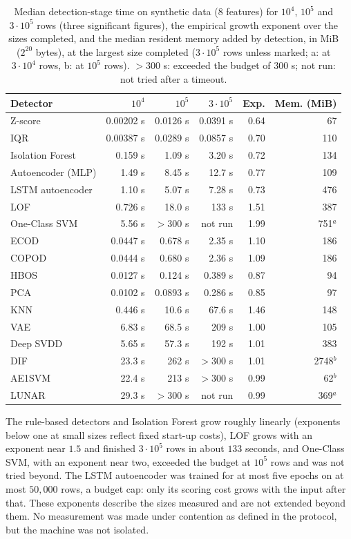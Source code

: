 \documentclass[conference]{IEEEtran}
\begin{document}
\begin{table}[t]
\caption{Median detection-stage time on synthetic data ($8$ features) for
$10^4$, $10^5$ and $3\cdot10^5$ rows (three significant figures), the empirical growth exponent over the
sizes completed, and the median resident memory added by detection, in MiB ($2^{20}$ bytes), at the largest
size completed ($3\cdot10^5$ rows unless marked; a: at $3\cdot10^4$ rows, b: at $10^5$ rows).
$>300$ s: exceeded the budget of $300$ s; not run: not tried after a timeout.}
\label{tab:cost}
\centering
\footnotesize
\setlength{\tabcolsep}{3pt}
\begin{tabular}{lrrrrr}
\toprule
Detector & $10^4$ & $10^5$ & $3\cdot10^5$ & Exp. & Mem. (MiB) \\
\midrule
Z-score & 0.00202 s & 0.0126 s & 0.0391 s & 0.64 & 67 \\
IQR & 0.00387 s & 0.0289 s & 0.0857 s & 0.70 & 110 \\
Isolation Forest & 0.159 s & 1.09 s & 3.20 s & 0.72 & 134 \\
Autoencoder (MLP) & 1.49 s & 8.45 s & 12.7 s & 0.77 & 109 \\
LSTM autoencoder & 1.10 s & 5.07 s & 7.28 s & 0.73 & 476 \\
LOF & 0.726 s & 18.0 s & 133 s & 1.51 & 387 \\
One-Class SVM & 5.56 s & $>300$ s & not run & 1.99 & 751$^{a}$ \\
\midrule
ECOD & 0.0447 s & 0.678 s & 2.35 s & 1.10 & 186 \\
COPOD & 0.0444 s & 0.680 s & 2.36 s & 1.09 & 186 \\
HBOS & 0.0127 s & 0.124 s & 0.389 s & 0.87 & 94 \\
PCA & 0.0102 s & 0.0893 s & 0.286 s & 0.85 & 97 \\
KNN & 0.446 s & 10.6 s & 67.6 s & 1.46 & 148 \\
VAE & 6.83 s & 68.5 s & 209 s & 1.00 & 105 \\
Deep SVDD & 5.65 s & 57.3 s & 192 s & 1.01 & 383 \\
DIF & 23.3 s & 262 s & $>300$ s & 1.01 & 2748$^{b}$ \\
AE1SVM & 22.4 s & 213 s & $>300$ s & 0.99 & 62$^{b}$ \\
LUNAR & 29.3 s & $>300$ s & not run & 0.99 & 369$^{a}$ \\
\bottomrule
\end{tabular}
\end{table}

The rule-based detectors and Isolation Forest grow roughly linearly (exponents
below one at small sizes reflect fixed start-up costs), LOF grows with an
exponent near $1.5$ and finished $3\cdot10^5$ rows in about $133$ seconds, and
One-Class SVM, with an exponent near two, exceeded the budget at $10^5$ rows
and was not tried beyond. The LSTM autoencoder was trained for at most five
epochs on at most $50{,}000$ rows, a budget cap: only its scoring cost grows
with the input after that. These exponents describe the sizes measured and are
not extended beyond them. No measurement was made under contention as defined
in the protocol, but the machine was not isolated.
\end{document}

